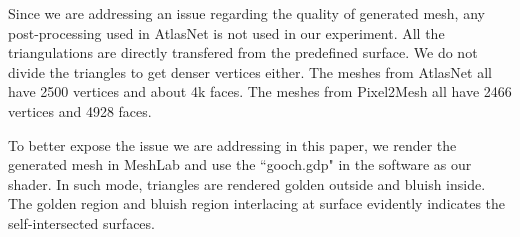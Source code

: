  Since we are addressing an issue regarding the quality of generated mesh, any post-processing used in AtlasNet \cite{atlasnet} is not used in our experiment. All the triangulations are directly transfered from the predefined surface. We do not divide the triangles to get denser vertices either. The meshes from AtlasNet all have 2500 vertices and about 4k faces. The meshes from Pixel2Mesh all have 2466 vertices and 4928 faces.

To better expose the issue we are addressing in this paper, we render the generated mesh in MeshLab and use the ``gooch.gdp" in the software as our shader. In such mode, triangles are rendered golden outside and bluish inside. The golden region and bluish region interlacing at surface evidently indicates the self-intersected surfaces.

